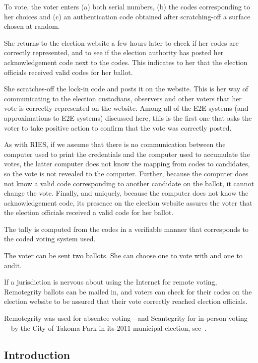 To vote, the voter enters (a) both serial numbers, (b) the codes
corresponding to her choices and (c) an authentication code obtained
after scratching-off a surface chosen at random.

She returns to the election website a few hours later to check if her
codes are correctly represented, and to see if the election authority
has posted her acknowledgement code next to the codes. This indicates
to her that the election officials received valid codes for her
ballot.

She scratches-off the lock-in code and posts it on the website. This
is her way of communicating to the election custodians, observers and
other voters that her vote is correctly represented on the
website. Among all of the E2E systems (and approximations to E2E
systems) discussed here, this is the first one that asks the voter to
take positive action to confirm that the vote was correctly posted.

As with RIES, if we assume that there is no communication between the
computer used to print the credentials and the computer used to
accumulate the votes, the latter computer does not know the mapping
from codes to candidates, so the vote is not revealed to the
computer. Further, because the computer does not know a valid code
corresponding to another candidate on the ballot, it cannot change the
vote.  Finally, and uniquely, because the computer does not know the
acknowledgement code, its presence on the election website assures the
voter that the election officials received a valid code for her
ballot.

The tally is computed from the codes in a verifiable manner that
corresponds to the coded voting system used.

The voter can be sent two ballots. She can choose one to vote with and
one to audit.

If a jurisdiction is nervous about using the Internet for remote
voting, Remotegrity ballots can be mailed in, and voters can check for
their codes on the election website to be assured that their vote
correctly reached election officials.

Remotegrity was used for absentee voting---and Scantegrity for
in-person voting---by the City of Takoma Park in its 2011 municipal
election, see~\cite{zagorski2013}.

\subsection{Introduction}

